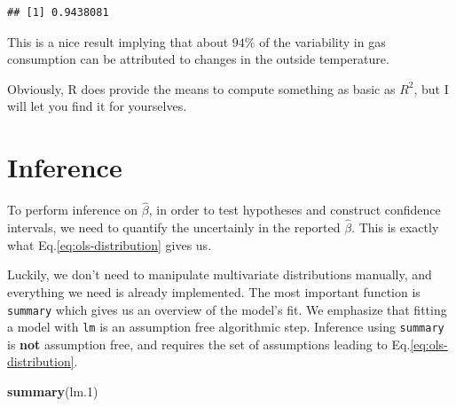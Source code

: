 \documentclass[]{book}
\newenvironment{Shaded}{\begin{snugshade}}{\end{snugshade}}
\newcommand{\ControlFlowTok}[1]{\textcolor[rgb]{0.13,0.29,0.53}{\textbf{#1}}}
\newcommand{\DataTypeTok}[1]{\textcolor[rgb]{0.13,0.29,0.53}{#1}}
\newcommand{\DecValTok}[1]{\textcolor[rgb]{0.00,0.00,0.81}{#1}}
\newcommand{\FloatTok}[1]{\textcolor[rgb]{0.00,0.00,0.81}{#1}}
\newcommand{\KeywordTok}[1]{\textcolor[rgb]{0.13,0.29,0.53}{\textbf{#1}}}
\newcommand{\NormalTok}[1]{#1}
\newcommand{\OperatorTok}[1]{\textcolor[rgb]{0.81,0.36,0.00}{\textbf{#1}}}
\newcommand{\StringTok}[1]{\textcolor[rgb]{0.31,0.60,0.02}{#1}}
\theoremstyle{definition}
\theoremstyle{definition}
\theoremstyle{definition}
\theoremstyle{remark}
\begin{document}
\begin{Shaded}
\end{Shaded}

\begin{verbatim}
## [1] 0.9438081
\end{verbatim}

This is a nice result implying that about \(94\%\) of the variability in gas consumption can be attributed to changes in the outside temperature.

Obviously, R does provide the means to compute something as basic as \(R^2\), but I will let you find it for yourselves.

\hypertarget{inference}{%
\section{Inference}\label{inference}}

To perform inference on \(\hat \beta\), in order to test hypotheses and construct confidence intervals, we need to quantify the uncertainly in the reported \(\hat \beta\).
This is exactly what Eq.\eqref{eq:ols-distribution} gives us.

Luckily, we don't need to manipulate multivariate distributions manually, and everything we need is already implemented.
The most important function is \texttt{summary} which gives us an overview of the model's fit.
We emphasize that fitting a model with \texttt{lm} is an assumption free algorithmic step.
Inference using \texttt{summary} is \textbf{not} assumption free, and requires the set of assumptions leading to Eq.\eqref{eq:ols-distribution}.

\begin{Shaded}
\begin{Highlighting}[]
\KeywordTok{summary}\NormalTok{(lm}\FloatTok{.1}\NormalTok{)}
\end{Highlighting}
\end{Shaded}
\end{document}
